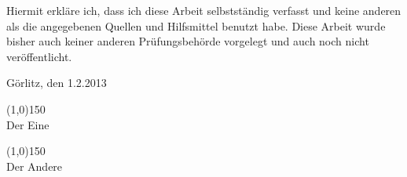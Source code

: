 \thispagestyle{empty}

Hiermit erkläre ich, dass ich diese Arbeit selbstständig verfasst und keine anderen als die angegebenen Quellen und Hilfsmittel benutzt habe.
Diese Arbeit wurde bisher auch keiner anderen Prüfungsbehörde vorgelegt und auch noch nicht veröffentlicht.

\vspace{5cm}

Görlitz, den 1.2.2013 %

\vspace{1cm}
\line(1,0){150}\\
Der Eine

\vspace{1cm}
\line(1,0){150}\\
Der Andere
